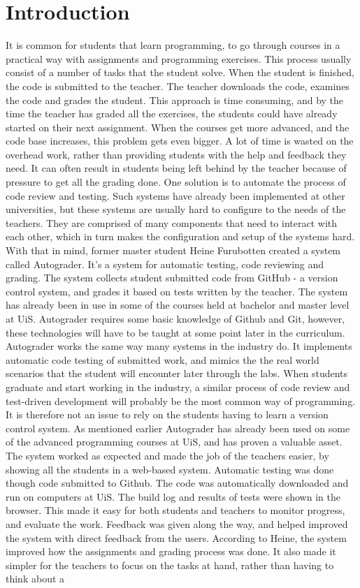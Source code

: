 \chapter*{Introduction}
It is common for students that learn programming, to go through courses in a practical way with assignments and programming exercises. This process usually consist of a number of tasks that the student solve. When the student is finished, the code is submitted to the teacher. The teacher downloads the code, examines the code and grades the student. This approach is time consuming, and by the time the teacher has graded all the exercises, the students could have already started on their next assignment. When the courses get more advanced, and the code base increases, this problem gets even bigger. A lot of time is wasted on the overhead work, rather than providing students with the help and feedback they need. It can often result in students being left behind by the teacher because of pressure to get all the grading done. One solution is to automate the process of code review and testing. Such systems have already been implemented at other universities, but these systems are usually hard to configure to the needs of the teachers. They are comprised of many components that need to interact with each other, which in turn makes the configuration and setup of the systems hard. With that in mind, former master student Heine Furubotten created a system called Autograder. It's a system for automatic testing, code reviewing and grading. The system collects student submitted code from GitHub - a version control system, and grades it based on tests written by the teacher. The system has already been in use in some of the courses held at bachelor and master level at UiS. Autograder requires some basic knowledge of Github and Git, however, these technologies will have to be taught at some point later in the curriculum. \\Autograder works the same way many systems in the industry do. It implements automatic code testing of submitted work, and mimics the the real world scenarios that the student will encounter later through the labs. When students graduate and start working in the industry, a similar process of code review and test-driven development will probably be the most common way of programming. It is therefore not an issue to rely on the students having to learn a version control system. As mentioned earlier Autograder has already been used on some of the advanced programming courses at UiS, and has proven a valuable asset. The system worked as expected and made the job of the teachers easier, by showing all the students in a web-based system. Automatic testing was done though code submitted to Github. The code was automatically downloaded and run on computers at UiS. The build log and results of tests were shown in the  browser. This made it easy for both students and teachers to monitor progress, and evaluate the work. Feedback was given along the way, and helped improved the system with direct feedback from the users. According to Heine, the system improved how the assignments and grading process was done. It also made it simpler for the teachers to focus on the tasks at hand, rather than having to think about a 